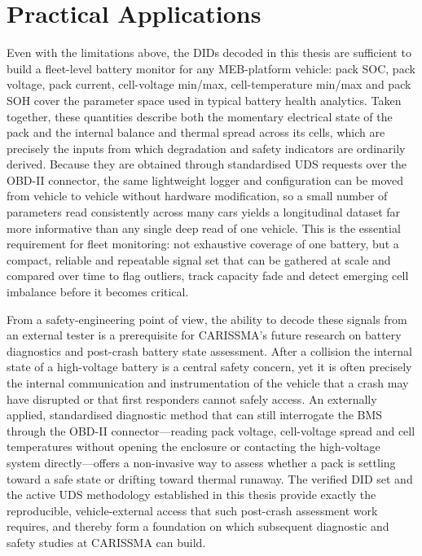 \documentclass[11pt,a4paper,oneside,parskip=half]{scrreprt}
\begin{document}
\section{Practical Applications}
Even with the limitations above, the DIDs decoded in this thesis are sufficient to build a fleet-level battery monitor for any MEB-platform vehicle: pack SOC, pack voltage, pack current, cell-voltage min/max, cell-temperature min/max and pack SOH cover the parameter space used in typical battery health analytics. Taken together, these quantities describe both the momentary electrical state of the pack and the internal balance and thermal spread across its cells, which are precisely the inputs from which degradation and safety indicators are ordinarily derived. Because they are obtained through standardised UDS requests over the OBD-II connector, the same lightweight logger and configuration can be moved from vehicle to vehicle without hardware modification, so a small number of parameters read consistently across many cars yields a longitudinal dataset far more informative than any single deep read of one vehicle. This is the essential requirement for fleet monitoring: not exhaustive coverage of one battery, but a compact, reliable and repeatable signal set that can be gathered at scale and compared over time to flag outliers, track capacity fade and detect emerging cell imbalance before it becomes critical.

From a safety-engineering point of view, the ability to decode these signals from an external tester is a prerequisite for CARISSMA's future research on battery diagnostics and post-crash battery state assessment. After a collision the internal state of a high-voltage battery is a central safety concern, yet it is often precisely the internal communication and instrumentation of the vehicle that a crash may have disrupted or that first responders cannot safely access. An externally applied, standardised diagnostic method that can still interrogate the BMS through the OBD-II connector---reading pack voltage, cell-voltage spread and cell temperatures without opening the enclosure or contacting the high-voltage system directly---offers a non-invasive way to assess whether a pack is settling toward a safe state or drifting toward thermal runaway. The verified DID set and the active UDS methodology established in this thesis provide exactly the reproducible, vehicle-external access that such post-crash assessment work requires, and thereby form a foundation on which subsequent diagnostic and safety studies at CARISSMA can build.
\end{document}

